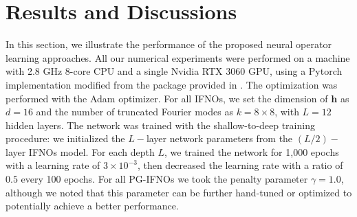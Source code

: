 \documentclass[twocolumn,10pt]{asme2ej}
\renewcommand{\~}{\tilde}
\renewcommand{\-}{\bar}
\newcommand{\8}{\infty}
\numberwithin{equation}{section}
\def \hb{\bm{h}}
\begin{document}
\section{Results and Discussions}\label{sec:results}

In this section, we illustrate the performance of the proposed neural operator learning approaches. All our numerical experiments were performed on a machine with 2.8 GHz 8-core CPU and a single Nvidia RTX 3060 GPU, using a Pytorch implementation modified from the package provided in \cite{li2020fourier}. The optimization was performed with the Adam optimizer. For all IFNOs, we set the dimension of $\hb$ as $d=16$ and the number of truncated Fourier modes as $k=8\times 8$, with $L=12$ hidden layers. The network was trained with the shallow-to-deep training procedure: we initialized the $L-$layer network parameters from the $(L/2)-$layer IFNOs model. For each depth $L$, we trained the network for 1,000 epochs with a learning rate of $3\times10^{-3}$, then decreased the learning rate with a ratio of $0.5$ every 100 epochs. For all PG-IFNOs we took the penalty parameter $\gamma=1.0$, although we noted that this parameter can be further hand-tuned or optimized to potentially achieve a better performance.
\end{document}
